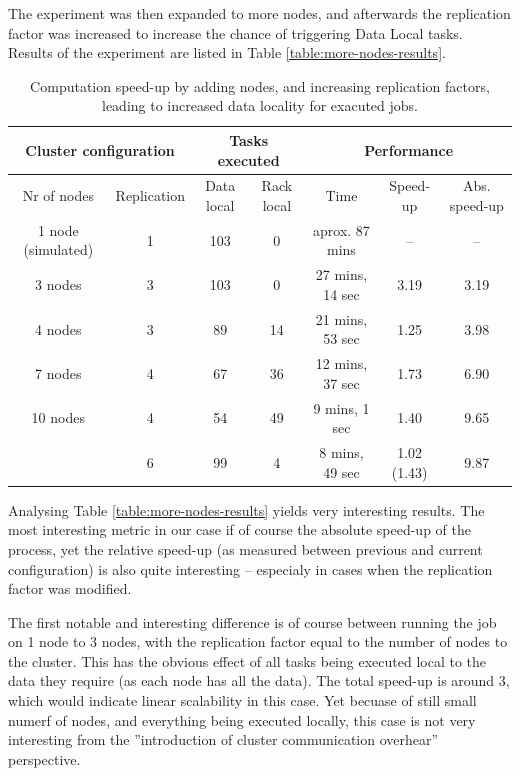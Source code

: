 The experiment was then expanded to more nodes, and afterwards the replication factor was increased to increase the chance of triggering Data Local tasks. Results of the experiment are listed in Table \ref{table:more-nodes-results}.

\begin{table}[hbt]
  \centering
  \begin{tabular}{|c c|c|c|c|c|c|}
  \hline
    \multicolumn{2}{|c|}{\textbf{Cluster configuration}} & \multicolumn{2}{|c|}{\textbf{Tasks executed}} & \multicolumn{3}{|c|}{\textbf{Performance}} \\ \hline
    Nr of nodes & Replication & Data local & Rack local   & Time              & Speed-up    & Abs. speed-up \\ \hline
    1 node (simulated)    & 1 & 103 & 0                   & aprox. 87 mins    & --          & --            \\ \hline
    3 nodes               & 3 & 103 & 0                   & 27 mins, 14 sec   & 3.19        & 3.19          \\ \hline
    4 nodes               & 3 & 89  & 14                  & 21 mins, 53 sec   & 1.25        & 3.98          \\ \hline
    7 nodes               & 4 & 67  & 36                  & 12 mins, 37 sec   & 1.73        & 6.90          \\ \hline
    10 nodes              & 4 & 54  & 49                  & 9 mins, 1 sec     & 1.40        & 9.65          \\       
                          & 6 & 99  & 4                   & 8 mins, 49 sec    & 1.02 (1.43) & 9.87          \\ \hline
  \end{tabular}
  \caption{Computation speed-up by adding nodes, and increasing replication factors, leading to increased data locality for exacuted jobs.}
  \label{tab:more-nodes-results}
\end{table}

Analysing Table \ref{table:more-nodes-results} yields very interesting results. The most interesting metric in our case if of course the absolute speed-up of the process, yet the relative speed-up (as measured between previous and current configuration) is also quite interesting -- especialy in cases when the replication factor was modified.

The first notable and interesting difference is of course between running the job on 1 node to 3 nodes, with the replication factor equal to the number of nodes to the cluster. This has the obvious effect of all tasks being executed local to the data they require (as each node has all the data). The total speed-up is around 3, which would indicate linear scalability in this case. Yet becuase of still small numerf of nodes, and everything being executed locally, this case is not very interesting from the ''introduction of cluster communication overhear'' perspective.

